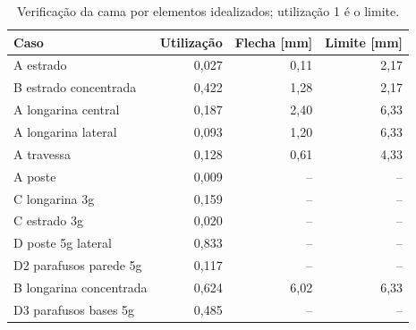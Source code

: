 \begin{table}[H]\centering\small
\caption{Verificação da cama por elementos idealizados; utilização 1 é o limite.}\label{tab:cama}
\begin{tabularx}{\linewidth}{Xrrr}
\toprule
Caso & Utilização & Flecha [mm] & Limite [mm] \\
\midrule
A estrado & 0,027 & 0,11 & 2,17 \\
B estrado concentrada & 0,422 & 1,28 & 2,17 \\
A longarina central & 0,187 & 2,40 & 6,33 \\
A longarina lateral & 0,093 & 1,20 & 6,33 \\
A travessa & 0,128 & 0,61 & 4,33 \\
A poste & 0,009 & -- & -- \\
C longarina 3g & 0,159 & -- & -- \\
C estrado 3g & 0,020 & -- & -- \\
D poste 5g lateral & 0,833 & -- & -- \\
D2 parafusos parede 5g & 0,117 & -- & -- \\
B longarina concentrada & 0,624 & 6,02 & 6,33 \\
D3 parafusos bases 5g & 0,485 & -- & -- \\
\bottomrule
\end{tabularx}
\end{table}
